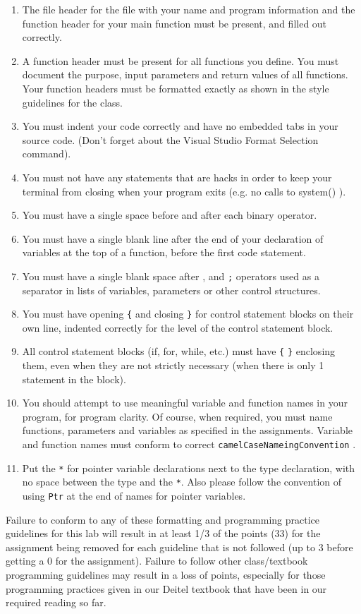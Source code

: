 \documentclass[11pt]{article}
\begin{document}
\begin{enumerate}
\item The file header for the file with your name and program information
and the function header for your main function must be present, and
filled out correctly.
\item A function header must be present for all functions you define.
You must document the purpose, input parameters and return values
of all functions.  Your function headers must be formatted exactly
as shown in the style guidelines for the class.
\item You must indent your code correctly and have no embedded tabs in
your source code. (Don't forget about the Visual Studio Format
Selection command).
\item You must not have any statements that are hacks in order to keep
your terminal from closing when your program exits (e.g. no calls
to system() ).
\item You must have a single space before and after each binary operator.
\item You must have a single blank line after the end of your declaration
of variables at the top of a function, before the first code
statement.
\item You must have a single blank space after , and \verb~;~ operators used as a
separator in lists of variables, parameters or other control
structures.
\item You must have opening \verb~{~ and closing \verb~}~ for control statement blocks
on their own line, indented correctly for the level of the control
statement block.
\item All control statement blocks (if, for, while, etc.) must have \verb~{~
\verb~}~ enclosing them, even when they are not strictly necessary
(when there is only 1 statement in the block).
\item You should attempt to use meaningful variable and function names in
your program, for program clarity.  Of course, when required, you
must name functions, parameters and variables as specified in the
assignments.  Variable and function names must conform to correct
\verb~camelCaseNameingConvention~ .
\item Put the \verb~*~ for pointer variable declarations next to the
type declaration, with no space between the type and the \verb~*~.
Also please follow the convention of using \verb~Ptr~ at the end of
names for pointer variables.
\end{enumerate}

Failure to conform to any of these formatting and programming practice
guidelines for this lab will result in at least 1/3 of the points (33)
for the assignment being removed for each guideline that is not
followed (up to 3 before getting a 0 for the assignment). Failure to
follow other class/textbook programming guidelines may result in a
loss of points, especially for those programming practices given in
our Deitel textbook that have been in our required reading so far.
\end{document}
